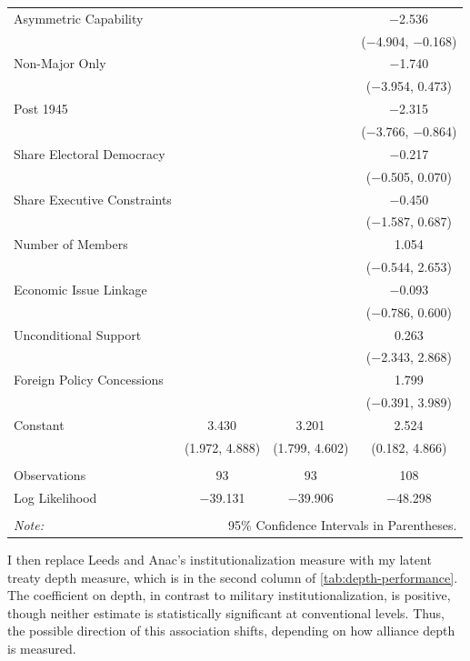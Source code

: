 \documentclass[12pt]{article}
\begin{document}
\begin{table}[!htbp]
\begin{adjustbox}{width= .95\textwidth, center}
\begin{tabular}{@{\extracolsep{5pt}}lccc}
  Asymmetric Capability &  &  & $-$2.536$^{}$ \\ 
  &  &  & ($-$4.904, $-$0.168) \\ 
  Non-Major Only &  &  & $-$1.740 \\ 
  &  &  & ($-$3.954, 0.473) \\ 
  Post 1945 &  &  & $-$2.315$^{}$ \\ 
  &  &  & ($-$3.766, $-$0.864) \\ 
  Share Electoral Democracy &  &  & $-$0.217 \\ 
  &  &  & ($-$0.505, 0.070) \\ 
  Share Executive Constraints &  &  & $-$0.450 \\ 
  &  &  & ($-$1.587, 0.687) \\ 
  Number of Members &  &  & 1.054 \\ 
  &  &  & ($-$0.544, 2.653) \\ 
  Economic Issue Linkage &  &  & $-$0.093 \\ 
  &  &  & ($-$0.786, 0.600) \\ 
  Unconditional Support &  &  & 0.263 \\ 
  &  &  & ($-$2.343, 2.868) \\ 
  Foreign Policy Concessions &  &  & 1.799 \\ 
  &  &  & ($-$0.391, 3.989) \\ 
  Constant & 3.430$^{}$ & 3.201$^{}$ & 2.524$^{}$ \\ 
  & (1.972, 4.888) & (1.799, 4.602) & (0.182, 4.866) \\ 
 \hline \\[-1.8ex] 
Observations & 93 & 93 & 108 \\ 
Log Likelihood & $-$39.131 & $-$39.906 & $-$48.298 \\ 
\hline 
\hline \\[-1.8ex] 
\textit{Note:}  & \multicolumn{3}{r}{95\% Confidence Intervals in Parentheses.} \\ 
\end{tabular}
\end{adjustbox} 
\end{table}


I then replace Leeds and Anac's institutionalization measure with my latent treaty depth measure, which is in the second column of \autoref{tab:depth-performance}. 
The coefficient on depth, in contrast to military institutionalization, is positive, though neither estimate is statistically significant at conventional levels. 
Thus, the possible direction of this association shifts, depending on how alliance depth is measured.
\end{document}
